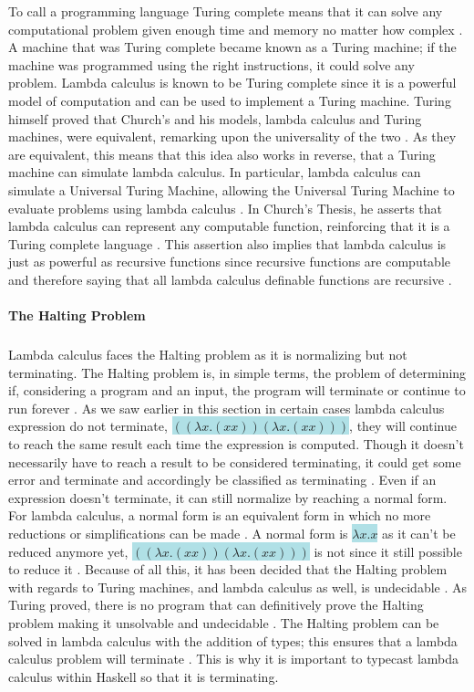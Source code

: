 \documentclass{article}
\begin{document}
To call a programming language Turing complete means that it can solve any computational problem given enough time and memory no matter how complex \cite{TC}. A machine that was Turing complete became known as a Turing machine; if the machine was programmed using the right instructions, it could solve any problem. Lambda calculus is known to be Turing complete since it is a powerful model of computation and can be used to implement a Turing machine. Turing himself proved that Church's and his models, lambda calculus and Turing machines, were equivalent, remarking upon the universality of the two \cite{OTM}. As they are equivalent, this means that this idea also works in reverse, that a Turing machine can simulate lambda calculus. In particular, lambda calculus can simulate a Universal Turing Machine, allowing the Universal Turing Machine to evaluate problems using lambda calculus \cite{LC}.  In Church's Thesis, he asserts that lambda calculus can represent any computable function, reinforcing that it is a Turing complete language \cite{FFP}. This assertion also implies that lambda calculus is just as powerful as recursive functions since recursive functions are computable and therefore saying that all lambda calculus definable functions are recursive \cite{FFP}.

\paragraph{The Halting Problem}

\subparagraph{}

Lambda calculus faces the Halting problem as it is normalizing but not terminating. The Halting problem is, in simple terms, the problem of determining if, considering a program and an input, the program will terminate or continue to run forever \cite{HP}. As we saw earlier in this section in certain cases lambda calculus expression do not terminate, \colorbox{powderblue}{$((\lambda x. (xx))(\lambda x. (xx)))$}, they will continue to reach the same result each time the expression is computed.  Though it doesn't necessarily have to reach a result to be considered terminating, it could get some error and terminate and accordingly be classified as terminating \cite{LC}. Even if an expression doesn't terminate, it can still normalize by reaching a normal form. For lambda calculus, a normal form is an equivalent form in which no more reductions or simplifications can be made \cite{LC}. A normal form is \colorbox{powderblue}{$\lambda x.x$} as it can't be reduced anymore yet, \colorbox{powderblue}{$((\lambda x. (xx))(\lambda x. (xx)))$} is not since it still possible to reduce it \cite{LC}. Because of all this, it has been decided that the Halting problem with regards to Turing machines, and lambda calculus as well, is undecidable \cite{LC}. As Turing proved, there is no program that can definitively prove the Halting problem making it unsolvable and undecidable \cite{HP}. The Halting problem can be solved in lambda calculus with the addition of types; this ensures that a lambda calculus problem will terminate \cite{LC}. This is why it is important to typecast lambda calculus within Haskell so that it is terminating.
\end{document}
